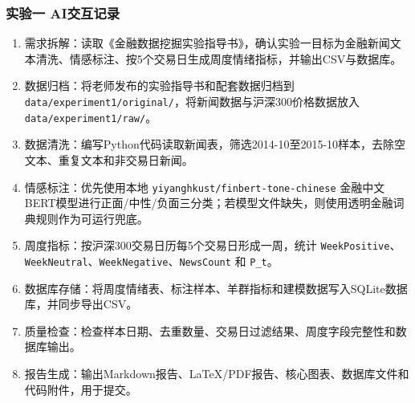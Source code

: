 \subsubsection{实验一 AI交互记录}\label{ux5b9eux9a8cux4e00-aiux4ea4ux4e92ux8bb0ux5f55}

\begin{enumerate}
\def\labelenumi{\arabic{enumi}.}
\tightlist
\item
  需求拆解：读取《金融数据挖掘实验指导书》，确认实验一目标为金融新闻文本清洗、情感标注、按5个交易日生成周度情绪指标，并输出CSV与数据库。
\item
  数据归档：将老师发布的实验指导书和配套数据归档到 \texttt{data/experiment1/original/}，将新闻数据与沪深300价格数据放入 \texttt{data/experiment1/raw/}。
\item
  数据清洗：编写Python代码读取新闻表，筛选2014-10至2015-10样本，去除空文本、重复文本和非交易日新闻。
\item
  情感标注：优先使用本地 \texttt{yiyanghkust/finbert-tone-chinese} 金融中文BERT模型进行正面/中性/负面三分类；若模型文件缺失，则使用透明金融词典规则作为可运行兜底。
\item
  周度指标：按沪深300交易日历每5个交易日形成一周，统计 \texttt{WeekPositive}、\texttt{WeekNeutral}、\texttt{WeekNegative}、\texttt{NewsCount} 和 \texttt{P\_t}。
\item
  数据库存储：将周度情绪表、标注样本、羊群指标和建模数据写入SQLite数据库，并同步导出CSV。
\item
  质量检查：检查样本日期、去重数量、交易日过滤结果、周度字段完整性和数据库输出。
\item
  报告生成：输出Markdown报告、LaTeX/PDF报告、核心图表、数据库文件和代码附件，用于提交。
\end{enumerate}
